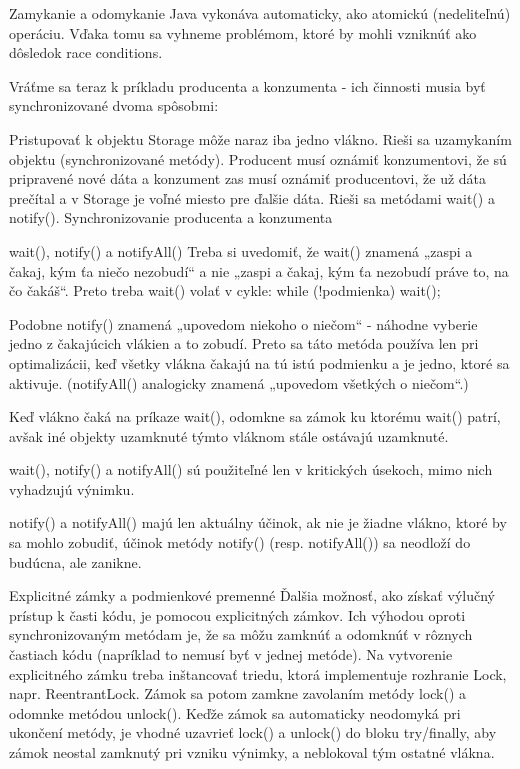Zamykanie a odomykanie Java vykonáva automaticky, ako atomickú (nedeliteľnú) operáciu. Vďaka tomu sa vyhneme problémom, ktoré by mohli vzniknúť ako dôsledok race conditions.

Vráťme sa teraz k príkladu producenta a konzumenta - ich činnosti musia byť synchronizované dvoma spôsobmi:

Pristupovať k objektu Storage môže naraz iba jedno vlákno. Rieši sa uzamykaním objektu (synchronizované metódy).
Producent musí oznámiť konzumentovi, že sú pripravené nové dáta a konzument zas musí oznámiť producentovi, že už dáta prečítal a v Storage je voľné miesto pre ďalšie dáta. Rieši sa metódami wait() a notify().
Synchronizovanie producenta a konzumenta



wait(), notify() a notifyAll()
Treba si uvedomiť, že wait() znamená „zaspi a čakaj, kým ťa niečo nezobudí“ a nie „zaspi a čakaj, kým ťa nezobudí práve to, na čo čakáš“. Preto treba wait() volať v cykle: while (!podmienka) wait();

Podobne notify() znamená „upovedom niekoho o niečom“ - náhodne vyberie jedno z čakajúcich vlákien a to zobudí. Preto sa táto metóda používa len pri optimalizácii, keď všetky vlákna čakajú na tú istú podmienku a je jedno, ktoré sa aktivuje. (notifyAll() analogicky znamená „upovedom všetkých o niečom“.)

Keď vlákno čaká na príkaze wait(), odomkne sa zámok ku ktorému wait() patrí, avšak iné objekty uzamknuté týmto vláknom stále ostávajú uzamknuté.

wait(), notify() a notifyAll() sú použiteľné len v kritických úsekoch, mimo nich vyhadzujú výnimku.

notify() a notifyAll() majú len aktuálny účinok, ak nie je žiadne vlákno, ktoré by sa mohlo zobudiť, účinok metódy notify() (resp. notifyAll()) sa neodloží do budúcna, ale zanikne.

Explicitné zámky a podmienkové premenné
Ďalšia možnosť, ako získať výlučný prístup k časti kódu, je pomocou explicitných zámkov. Ich výhodou oproti synchronizovaným metódam je, že sa môžu zamknúť a odomknúť v rôznych častiach kódu (napríklad to nemusí byť v jednej metóde). Na vytvorenie explicitného zámku treba inštancovať triedu, ktorá implementuje rozhranie Lock, napr. ReentrantLock. Zámok sa potom zamkne zavolaním metódy lock() a odomnke metódou unlock(). Keďže zámok sa automaticky neodomyká pri ukončení metódy, je vhodné uzavrieť lock() a unlock() do bloku try/finally, aby zámok neostal zamknutý pri vzniku výnimky, a neblokoval tým ostatné vlákna.

